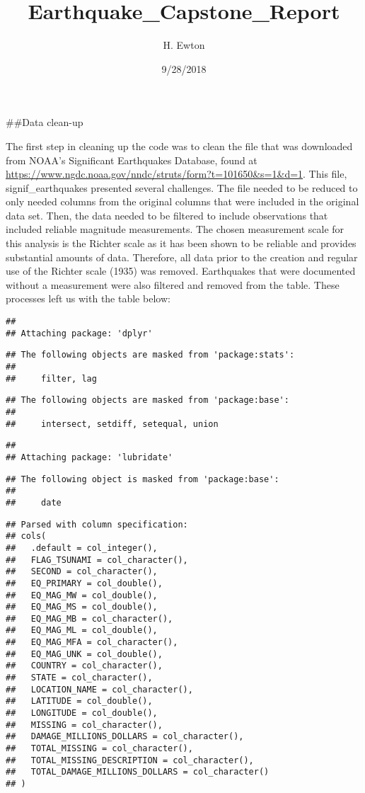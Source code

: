 \documentclass[]{article}
\title{Earthquake\_Capstone\_Report}
\author{H. Ewton}
\date{9/28/2018}
\begin{document}
\maketitle

\#\#Data clean-up

The first step in cleaning up the code was to clean the file that was
downloaded from NOAA's Significant Earthquakes Database, found at
\url{https://www.ngdc.noaa.gov/nndc/struts/form?t=101650\&s=1\&d=1}.
This file, signif\_earthquakes presented several challenges. The file
needed to be reduced to only needed columns from the original columns
that were included in the original data set. Then, the data needed to be
filtered to include observations that included reliable magnitude
measurements. The chosen measurement scale for this analysis is the
Richter scale as it has been shown to be reliable and provides
substantial amounts of data. Therefore, all data prior to the creation
and regular use of the Richter scale (1935) was removed. Earthquakes
that were documented without a measurement were also filtered and
removed from the table. These processes left us with the table below:

\begin{verbatim}
## 
## Attaching package: 'dplyr'
\end{verbatim}

\begin{verbatim}
## The following objects are masked from 'package:stats':
## 
##     filter, lag
\end{verbatim}

\begin{verbatim}
## The following objects are masked from 'package:base':
## 
##     intersect, setdiff, setequal, union
\end{verbatim}

\begin{verbatim}
## 
## Attaching package: 'lubridate'
\end{verbatim}

\begin{verbatim}
## The following object is masked from 'package:base':
## 
##     date
\end{verbatim}

\begin{verbatim}
## Parsed with column specification:
## cols(
##   .default = col_integer(),
##   FLAG_TSUNAMI = col_character(),
##   SECOND = col_character(),
##   EQ_PRIMARY = col_double(),
##   EQ_MAG_MW = col_double(),
##   EQ_MAG_MS = col_double(),
##   EQ_MAG_MB = col_character(),
##   EQ_MAG_ML = col_double(),
##   EQ_MAG_MFA = col_character(),
##   EQ_MAG_UNK = col_double(),
##   COUNTRY = col_character(),
##   STATE = col_character(),
##   LOCATION_NAME = col_character(),
##   LATITUDE = col_double(),
##   LONGITUDE = col_double(),
##   MISSING = col_character(),
##   DAMAGE_MILLIONS_DOLLARS = col_character(),
##   TOTAL_MISSING = col_character(),
##   TOTAL_MISSING_DESCRIPTION = col_character(),
##   TOTAL_DAMAGE_MILLIONS_DOLLARS = col_character()
## )
\end{verbatim}
\end{document}
